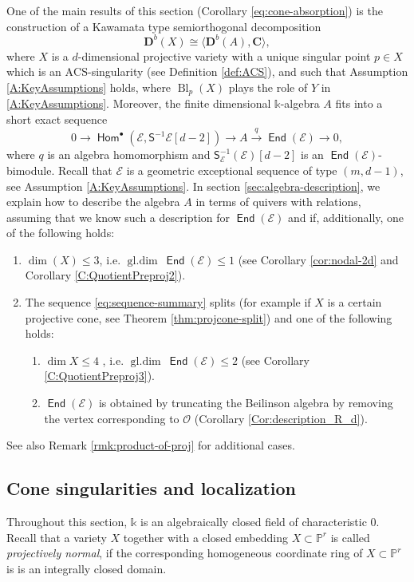 \documentclass[a4paper,11pt, reqno]{amsart}
\def\P{\mathbb P}
\def\CC{\mathbf C}
\def\DD{\mathbf D}
\def\OO{\mathcal O}
\def\sE{\mathscr{E}}
\def\Bl{{\operatorname{Bl}}}
\def\gldim{{\operatorname{gl.dim}\ }}
\newcommand{\opname}[1]{\operatorname{\mathsf{#1}}}
\newcommand{\Hom}{\opname{Hom}}
\newcommand{\End}{\opname{End}}
\def\Db{\DD^b}
\newcommand{\bS}{\mathsf{S}}
\theoremstyle{plain}
\theoremstyle{definition}
\numberwithin{equation}{section}
\newlength{\arrow}
\begin{document}
One of the main results of this section (Corollary \ref{eq:cone-absorption}) is the construction of a Kawamata type semiorthogonal decomposition  
\[
\Db(X) \cong \langle \Db(A) , \CC \rangle ,
\]
where $X$ is a $d$-dimensional projective variety with  a unique  singular point $p \in X$ which is an $\mathrm{ACS}$-singularity (see Definition \ref{def:ACS}), and such 
that Assumption \ref{A:KeyAssumptions} holds, where $ \Bl_p (X)$ plays the role of $Y$ in \ref{A:KeyAssumptions}.
Moreover, the finite dimensional $\mathbb{k}$-algebra $A$ fits into a short exact sequence
\begin{equation}\label{eq:sequence-summary}
           0\to \Hom^\bullet ( \sE , \bS^{-1} \sE [d-2] ) \to A \xrightarrow{q} \End (  \sE ) \to 0 ,
\end{equation}
where $q$ is an algebra homomorphism and $\bS_\sE^{-1}(\sE)[d-2]$ is an $\End(\sE)$-bimodule.
Recall that $\sE$ is a geometric exceptional sequence of type $(m, d-1)$, see Assumption \ref{A:KeyAssumptions}.
In section \ref{sec:algebra-description},
we explain how to describe the algebra $A$ in terms of quivers with relations, assuming that we know such a description for $\End(\sE)$ and if, additionally, one of the following holds: 
\begin{enumerate}
    \item  $\dim(X) \leq 3$, i.e. $\gldim \End(\sE) \leq 1$ (see Corollary \ref{cor:nodal-2d} and Corollary \ref{C:QuotientPreproj2}).
    \item The sequence \eqref{eq:sequence-summary} splits (for example if $X$ is a certain projective cone, see Theorem \ref{thm:projcone-split}) and one of the following holds:
    \begin{enumerate}
        \item $\dim X\leq 4$ , i.e. $\gldim \End(\sE) \leq 2$ (see Corollary \ref{C:QuotientPreproj3}).
    \item $\End(\sE)$ is obtained by truncating the Beilinson algebra by removing the vertex corresponding to $\OO$ (Corollary \ref{Cor:description_R_d}).
    \end{enumerate}
\end{enumerate}
See also Remark \ref{rmk:product-of-proj} for additional cases.

\subsection{Cone singularities and localization}\label{subsec:cone-and-localization}
Throughout this section,  $\mathbb k$ is an algebraically closed field of characteristic $0$.
Recall that a variety $X $ together with a closed embedding $X\subset \P^r$ is called \emph{projectively normal}, if the corresponding homogeneous coordinate ring of $X \subset \P^r$ is  is an integrally closed domain.
\end{document}
